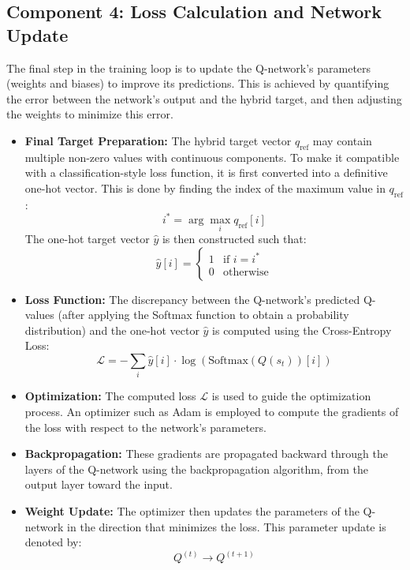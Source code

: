 \documentclass[12pt]{report}
\begin{document}
\subsection{Component 4: Loss Calculation and Network Update}

The final step in the training loop is to update the Q-network’s parameters (weights and biases) to improve its predictions. This is achieved by quantifying the error between the network’s output and the hybrid target, and then adjusting the weights to minimize this error.

\begin{itemize}
    \item \textbf{Final Target Preparation:} 
    The hybrid target vector $q_{\text{ref}}$ may contain multiple non-zero values with continuous components. To make it compatible with a classification-style loss function, it is first converted into a definitive one-hot vector. This is done by finding the index of the maximum value in $q_{\text{ref}}$:
    \[
    i^* = \arg\max_i q_{\text{ref}}[i]
    \]
    The one-hot target vector $\hat{y}$ is then constructed such that:
    \[
    \hat{y}[i] = 
    \begin{cases}
        1 & \text{if } i = i^* \\
        0 & \text{otherwise}
    \end{cases}
    \]

    \item \textbf{Loss Function:}
    The discrepancy between the Q-network’s predicted Q-values (after applying the Softmax function to obtain a probability distribution) and the one-hot vector $\hat{y}$ is computed using the Cross-Entropy Loss:
    \[
    \mathcal{L} = -\sum_i \hat{y}[i] \cdot \log(\text{Softmax}(Q(s_t))[i])
    \]

    \item \textbf{Optimization:}
    The computed loss $\mathcal{L}$ is used to guide the optimization process. An optimizer such as Adam is employed to compute the gradients of the loss with respect to the network’s parameters.

    \item \textbf{Backpropagation:}
    These gradients are propagated backward through the layers of the Q-network using the backpropagation algorithm, from the output layer toward the input.

    \item \textbf{Weight Update:}
    The optimizer then updates the parameters of the Q-network in the direction that minimizes the loss. This parameter update is denoted by:
    \[
    Q^{(t)} \rightarrow Q^{(t+1)}
    \]
\end{itemize}
\end{document}
